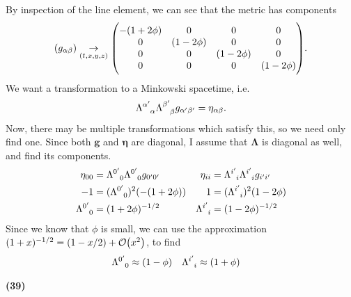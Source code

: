 \documentclass[gr-notes.tex]{subfiles}
\begin{document}
By inspection of the line element, we can see that the metric has components
%
\begin{displaymath}
  (g_{\alpha\beta}) \underset{(t,x,y,z)}{\to}
  \mqty(\dmat[0]{-(1+2\phi),(1-2\phi),(1-2\phi),(1-2\phi)}).
\end{displaymath}
%
We want a transformation to a Minkowski spacetime, i.e.
%
\begin{displaymath}
  \tensor{\Lambda}{^{\alpha'}_\alpha}
  \tensor{\Lambda}{^{\beta'}_\beta}
  g_{\alpha'\beta'} =
  \eta_{\alpha\beta}.
\end{displaymath}
%
Now, there may be multiple transformations which satisfy this, so we need only find one. Since both $\boldsymbol{g}$ and $\boldsymbol{\eta}$ are diagonal, I assume that $\boldsymbol{\Lambda}$ is diagonal as well, and find its components.
%
\begin{align*}
  \eta_{00} &=
  \tensor{\Lambda}{^{0'}_0}
  \tensor{\Lambda}{^{0'}_0}
  g_{0'0'} &
  \eta_{ii} &=
  \tensor{\Lambda}{^{i'}_i}
  \tensor{\Lambda}{^{i'}_i}
  g_{i'i'}
  \\
  -1 &=
  (\tensor{\Lambda}{^{0'}_0})^2 (-(1 + 2\phi)) &
  1 &=
  (\tensor{\Lambda}{^{i'}_i})^2
  (1 - 2\phi)
  \\
  \tensor{\Lambda}{^{0'}_0} &=
  (1 + 2\phi)^{-1/2} &
  \tensor{\Lambda}{^{i'}_i} &=
  (1 - 2\phi)^{-1/2}
\end{align*}
%
Since we know that $\phi$ is small, we can use the approximation
$(1 + x)^{-1/2} = (1 - x/2) + \order{x^2}$, to find
%
\begin{align*}
  \tensor{\Lambda}{^{0'}_0} &\approx
  (1 - \phi) &
  \tensor{\Lambda}{^{i'}_i} &\approx
  (1 + \phi)
\end{align*}

\textbf{(39)}
\end{document}
